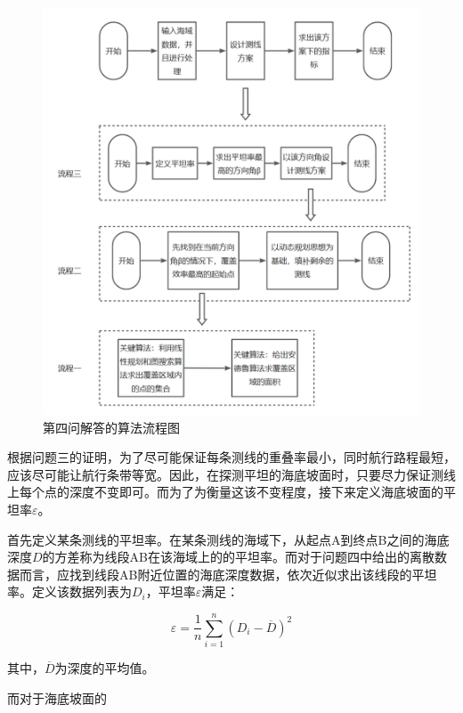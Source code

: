 \begin{figure}[h]
    \centering
    \includegraphics[scale=0.3]{res/img/第四问解答的算法流程图.png}
    \caption[short]{第四问解答的算法流程图}
\end{figure}


根据问题三的证明，为了尽可能保证每条测线的重叠率最小，同时航行路程最短，应该尽可能让航行条带等宽。因此，在探测平坦的海底坡面时，只要尽力保证测线上每个点的深度不变即可。而为了为衡量这该不变程度，接下来定义海底坡面的平坦率$\varepsilon$。

首先定义某条测线的平坦率。在某条测线的海域下，从起点A到终点B之间的海底深度$D$的方差称为线段AB在该海域上的的平坦率。而对于问题四中给出的离散数据而言，应找到线段AB附近位置的海底深度数据，依次近似求出该线段的平坦率。定义该数据列表为$D_{i}$，平坦率$\varepsilon$满足：

\begin{equation}
    \varepsilon = \frac{1}{n} \sum^{n}_{i=1}(D_i - \overline{D} )^2
\end{equation}

其中，$\overline{D}$为深度的平均值。

而对于海底坡面的

